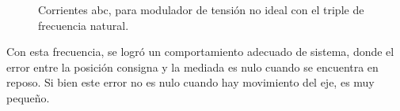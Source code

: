 \documentclass[a4paper, 10pt, onecolumn,journal]{ieeeconf}
\begin{document}
\begin{figure}[H]
	\centering
	\begin{adjustbox}{scale=0.58,max width=\columnwidth}
	\end{adjustbox}
	\caption{Corrientes abc, para modulador de tensión no ideal con el triple de frecuencia natural.}
	\label{Corrientes abc, para modulador de tensión no ideal con el triple de frecuencia natural}
\end{figure}
Con esta frecuencia, se logró un comportamiento adecuado de sistema, donde el error entre la posición consigna y la mediada es nulo cuando se encuentra en reposo. Si bien este error no es nulo cuando hay movimiento del eje, es muy pequeño.
\end{document}
